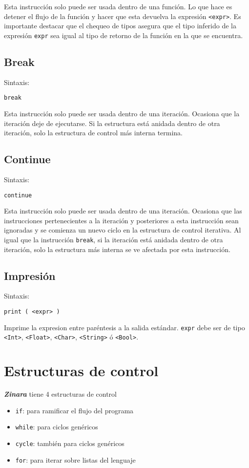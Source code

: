 \documentclass[12pt, spanish]{report}
\begin{document}
Esta instrucci\'on solo puede ser usada dentro de una funci\'on. Lo
que hace es detener el flujo de la funci\'on y hacer que esta devuelva
la expresi\'on \texttt{<expr>}. Es importante destacar que el chequeo
de tipos asegura que el tipo inferido de la expresi\'on \texttt{expr}
sea igual al tipo de retorno de la funci\'on en la que se encuentra.

\section{Break}
\label{sec:return}
Sintaxis:
\begin{verbatim}
break
\end{verbatim}

Esta instrucci\'on solo puede ser usada dentro de una
iteraci\'on. Ocasiona que la iteraci\'on deje de ejecutarse.
Si la estructura est\'a anidada dentro de otra iteraci\'on,
solo la estructura de control m\'as interna termina.

\section{Continue}
\label{sec:return}
Sintaxis:
\begin{verbatim}
continue
\end{verbatim}

Esta instrucci\'on solo puede ser usada dentro de una
iteraci\'on. Ocasiona que las instrucciones pertenecientes a la
iteraci\'on y posteriores a esta instrucci\'on sean ignoradas y se
comienza un nuevo ciclo en la estructura de control iterativa.  Al
igual que la instrucci\'on \texttt{break}, si la iteraci\'on est\'a
anidada dentro de otra iteraci\'on, solo la estructura m\'as interna
se ve afectada por esta instrucci\'on.

\section{Impresi\'on}
\label{inst:impresion}
Sintaxis:
\begin{verbatim}
print ( <expr> )
\end{verbatim}

Imprime la expresion entre par\'entesis a la salida
est\'andar. \texttt{expr} debe ser de tipo \texttt{<Int>},
\texttt{<Float>}, \texttt{<Char>}, \texttt{<String>} ó
\texttt{<Bool>}.

\chapter{Estructuras de control}
\label{sec:ecntrl}
\emph{\textbf{Zinara}} tiene 4 estructuras de control
\begin{itemize}
\item \texttt{if}: para ramificar el flujo del programa
\item \texttt{while}: para ciclos gen\'ericos
\item \texttt{cycle}: tambi\'en para ciclos gen\'ericos
\item \texttt{for}: para iterar sobre listas del lenguaje
\end{itemize}
\end{document}

